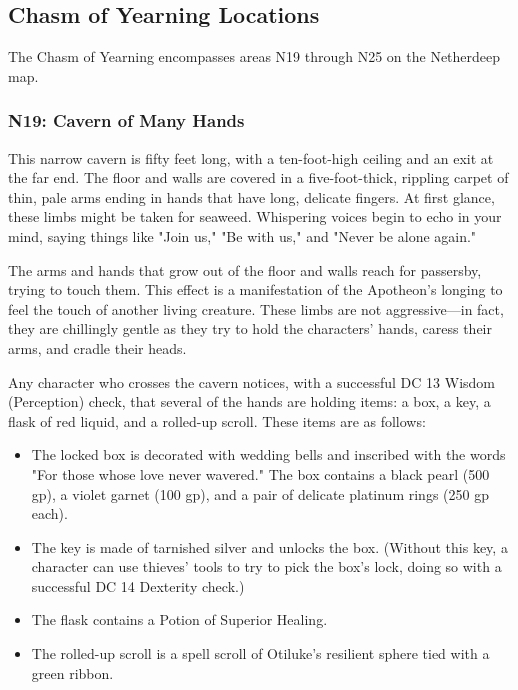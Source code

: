 \documentclass[10pt,a4paper,twoside,bg=print,twocolumn,openany,nodeprecatedcode]{dndbook}
\begin{document}
\subsection{Chasm of Yearning Locations}
The Chasm of Yearning encompasses areas N19 through N25 on the Netherdeep map.

\subsubsection{N19: Cavern of Many Hands}
\begin{DndReadAloud}{}
This narrow cavern is fifty feet long, with a ten-foot-high ceiling and an exit at the far end. The floor and walls are covered in a five-foot-thick, rippling carpet of thin, pale arms ending in hands that have long, delicate fingers. At first glance, these limbs might be taken for seaweed. Whispering voices begin to echo in your mind, saying things like "Join us," "Be with us," and "Never be alone again."

\end{DndReadAloud}

The arms and hands that grow out of the floor and walls reach for passersby, trying to touch them. This effect is a manifestation of the Apotheon's longing to feel the touch of another living creature. These limbs are not aggressive—in fact, they are chillingly gentle as they try to hold the characters' hands, caress their arms, and cradle their heads.

Any character who crosses the cavern notices, with a successful DC 13 Wisdom (Perception) check, that several of the hands are holding items: a box, a key, a flask of red liquid, and a rolled-up scroll. These items are as follows:


\begin{itemize}
\item The locked box is decorated with wedding bells and inscribed with the words "For those whose love never wavered." The box contains a black pearl (500 gp), a violet garnet (100 gp), and a pair of delicate platinum rings (250 gp each).
\item The key is made of tarnished silver and unlocks the box. (Without this key, a character can use thieves' tools to try to pick the box's lock, doing so with a successful DC 14 Dexterity check.)
\item The flask contains a Potion of Superior Healing.
\item The rolled-up scroll is a spell scroll of Otiluke's resilient sphere tied with a green ribbon.
\end{itemize}
\end{document}
